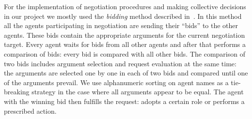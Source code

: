For the implementation of negotiation procedures and making collective decisions in our project we mostly used the \emph{bidding} method described in~\cite{bordini_programming_2007}.
In this method all the agents participating in negotiation are sending their \enquote{bids} to the other agents.
These bids contain the appropriate arguments for the current negotiation target.
Every agent waits for bids from all other agents and after that performs a comparison of bids: every bid is compared with all other bids.
The comparison of two bids includes argument selection and request evaluation at the same time: the arguments are selected one by one in each of two bids and compared until one of the arguments prevail.
We use alphanumeric sorting on agent names as a tie-breaking strategy in the case where all arguments appear to be equal.
The agent with the winning bid then fulfills the request: adopts a certain role or performs a prescribed action.

